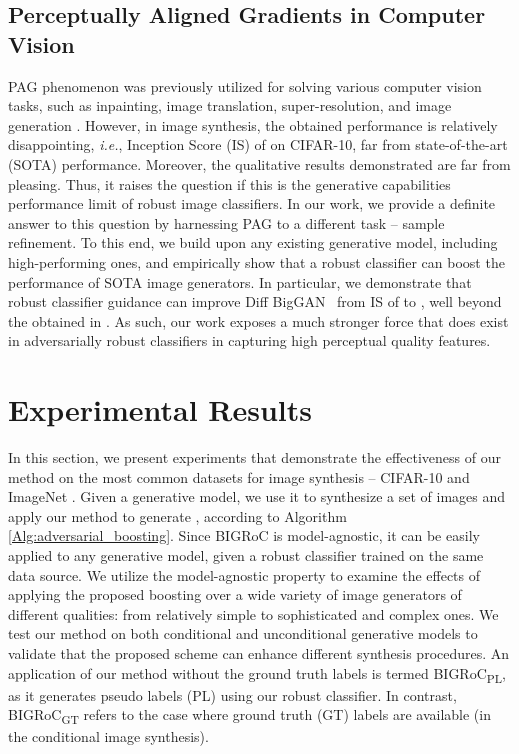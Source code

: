 \documentclass[10pt]{article} \usepackage[accepted]{tmlr}
\begin{document}
\subsection{Perceptually Aligned Gradients in Computer Vision}
PAG phenomenon was previously utilized for solving various computer vision tasks, such as inpainting, image translation, super-resolution, and image generation \citep{santurkar2019image}. 
However, in image synthesis, the obtained performance is relatively disappointing, \textit{i.e.}, Inception Score (IS) of  on CIFAR-10, far from state-of-the-art (SOTA) performance. 
Moreover, the qualitative results demonstrated are far from pleasing.
Thus, it raises the question if this is the generative capabilities performance limit of robust image classifiers.
In our work, we provide a definite answer to this question by harnessing PAG to a different task -- sample refinement.
To this end, we build upon any existing generative model, including high-performing ones, and empirically show that a robust classifier can boost the performance of SOTA image generators. In particular, we demonstrate that robust classifier guidance can improve Diff BigGAN~\citep{zhao2020differentiable} from IS of  to , well beyond the  obtained in \citep{santurkar2019image}.
As such, our work exposes a much stronger force that does exist in adversarially robust classifiers in capturing high perceptual quality features.

\section{Experimental Results}

In this section, we present experiments that demonstrate the effectiveness of our method on the most common datasets for image synthesis -- CIFAR-10 \citep{Krizhevsky09learningmultiple} and ImageNet \citep{deng2009imagenet}.
Given a generative model, we use it to synthesize a set of images  and apply our method to generate , according to Algorithm \ref{Alg:adversarial_boosting}.
Since BIGRoC is model-agnostic, it can be easily applied to any generative model, given a robust classifier trained on the same data source.
We utilize the model-agnostic property to examine the effects of applying the proposed boosting over a wide variety of image generators of different qualities: from relatively simple  to sophisticated and complex ones.
We test our method on both conditional and unconditional generative models to validate that the proposed scheme can enhance different synthesis procedures.
An application of our method without the ground truth labels is termed  BIGRoC\textsubscript{PL}, as it generates pseudo labels (PL) using our robust classifier.
In contrast, BIGRoC\textsubscript{GT} refers to the case where ground truth (GT) labels are available (in the conditional image synthesis).
\end{document}
